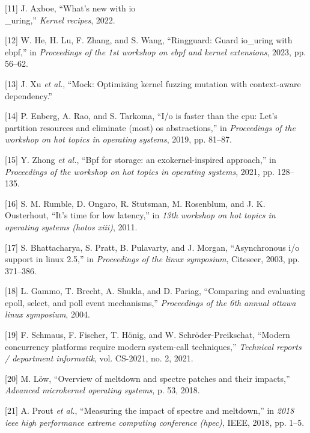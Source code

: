 \documentclass[conference]{IEEEtran}{article}
\begin{document}
\begin{hangparas}{1.5em}{1}
\hypertarget{citeproc_bib_item_11}{[11] J. Axboe, “What’s new with io\\_uring,” \textit{Kernel recipes}, 2022.}

\hypertarget{citeproc_bib_item_12}{[12] W. He, H. Lu, F. Zhang, and S. Wang, “Ringguard: Guard io\_uring with ebpf,” in \textit{Proceedings of the 1st workshop on ebpf and kernel extensions}, 2023, pp. 56–62.}

\hypertarget{citeproc_bib_item_13}{[13] J. Xu \textit{et al.}, “Mock: Optimizing kernel fuzzing mutation with context-aware dependency.”}

\hypertarget{citeproc_bib_item_14}{[14] P. Enberg, A. Rao, and S. Tarkoma, “I/o is faster than the cpu: Let’s partition resources and eliminate (most) os abstractions,” in \textit{Proceedings of the workshop on hot topics in operating systems}, 2019, pp. 81–87.}

\hypertarget{citeproc_bib_item_15}{[15] Y. Zhong \textit{et al.}, “Bpf for storage: an exokernel-inspired approach,” in \textit{Proceedings of the workshop on hot topics in operating systems}, 2021, pp. 128–135.}

\hypertarget{citeproc_bib_item_16}{[16] S. M. Rumble, D. Ongaro, R. Stutsman, M. Rosenblum, and J. K. Ousterhout, “It’s time for low latency,” in \textit{13th workshop on hot topics in operating systems (hotos xiii)}, 2011.}

\hypertarget{citeproc_bib_item_17}{[17] S. Bhattacharya, S. Pratt, B. Pulavarty, and J. Morgan, “Asynchronous i/o support in linux 2.5,” in \textit{Proceedings of the linux symposium}, Citeseer, 2003, pp. 371–386.}

\hypertarget{citeproc_bib_item_18}{[18] L. Gammo, T. Brecht, A. Shukla, and D. Pariag, “Comparing and evaluating epoll, select, and poll event mechanisms,” \textit{Proceedings of the 6th annual ottawa linux symposium}, 2004.}

\hypertarget{citeproc_bib_item_19}{[19] F. Schmaus, F. Fischer, T. Hönig, and W. Schröder-Preikschat, “Modern concurrency platforms require modern system-call techniques,” \textit{Technical reports / department informatik}, vol. CS-2021, no. 2, 2021.}

\hypertarget{citeproc_bib_item_20}{[20] M. Löw, “Overview of meltdown and spectre patches and their impacts,” \textit{Advanced microkernel operating systems}, p. 53, 2018.}

\hypertarget{citeproc_bib_item_21}{[21] A. Prout \textit{et al.}, “Measuring the impact of spectre and meltdown,” in \textit{2018 ieee high performance extreme computing conference (hpec)}, IEEE, 2018, pp. 1–5.}


\end{hangparas}
\end{document}
